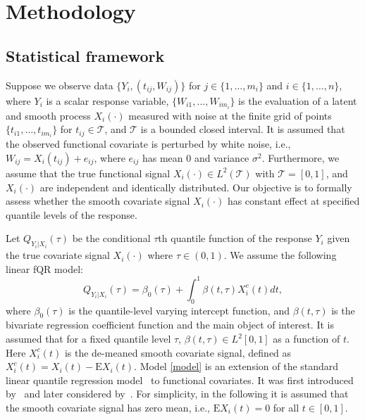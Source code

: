\documentclass[times,sort&compress,3p]{elsarticle}
\theoremstyle{plain}%
\theoremstyle{definition}
\newcommand{\E}{\mathrm{E}}
\begin{document}
\section{Methodology}
\label{section:method}

\subsection{Statistical framework} 
Suppose we observe data $\{Y_i, (t_{ij}, W_{ij})\}$ for $j \in \{1, \ldots, m_i\}$ and $i \in \{1, \ldots, n\}$, where $Y_i$ is a scalar response variable, $\{W_{i1}, \ldots, W_{im_i}\}$ is the evaluation of a latent and smooth process $X_i(\cdot)$ measured with noise at the finite grid of points $\{t_{i1}, \ldots, t_{im_i}\}$ for $t_{ij} \in \mathcal{T}$, and $\mathcal{T}$ is a bounded closed interval. It is assumed that the observed functional covariate is perturbed by white noise, i.e., $W_{ij} = X_i(t_{ij})+e_{ij}$, where $e_{ij}$ has mean 0 and variance $\sigma^2$. Furthermore, we assume that the true functional signal $X_i(\cdot) \in L^2(\mathcal{T})$ with $\mathcal{T} = [0,1]$, and $X_i(\cdot)$ are independent and identically distributed.  Our objective is to formally assess whether the smooth covariate signal $X_i(\cdot)$ has constant effect at specified quantile levels of the response. 


Let $Q_{Y_i|X_i}(\tau)$ be the conditional $\tau$th quantile function of the response $Y_i$
given the true covariate signal $X_i(\cdot)$ where $\tau \in (0,1)$. We assume
the following linear fQR model:
\begin{equation}\label{model} 
Q_{Y_i|X_i}(\tau) = \beta_0(\tau) + \int_0^1 \beta(t, \tau)
X_i^c(t) dt,
\end{equation} 
where $\beta_0(\tau)$ is the quantile-level varying intercept function, and $\beta(t, \tau)$ is the bivariate regression coefficient function and the main object of interest. It is assumed that for a fixed quantile level $\tau$, $\beta(t, \tau)\in L^2[0,1]$ as a function of $t$. Here $X_i^c(t)$ is the de-meaned smooth covariate signal, defined as  $X_i^c(t) = X_i(t) - \E X_i(t)$. Model \eqref{model} is an extension of the standard linear quantile
regression model~\citep{koenker2005} to functional covariates. It was
first introduced by~\cite{Cardot+:05} and later considered by~\cite{chen+muller2012,Kato:12}. For simplicity, in the following it is assumed that the smooth covariate signal has zero mean, i.e., $\E X_i(t) =0$ for all $t\in [0,1]$.  
\end{document}
